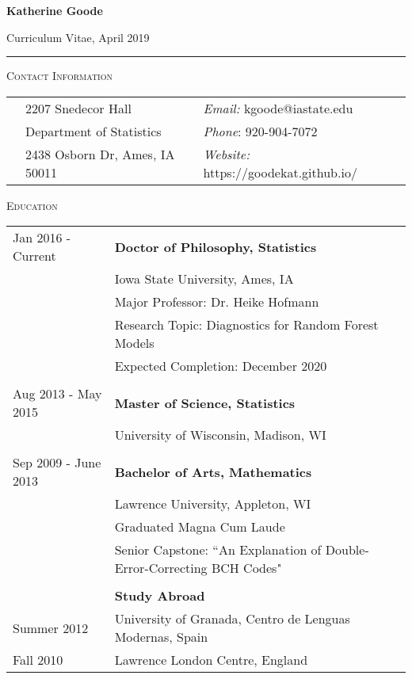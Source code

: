 \documentclass[10pt, oneside]{article}
\begin{document}
\begin{LARGE} \noindent\textbf{Katherine Goode} \end{LARGE} \hfill Curriculum Vitae, April 2019\\
\rule{\textwidth}{1pt}

\vspace{0.25cm}

\noindent \textsc{Contact Information} \hrulefill
\begin{longtable}{p{3.9cm}p{6.5cm}p{6.5cm}}
& 2207 Snedecor Hall & \emph{Email:} kgoode@iastate.edu\\
& Department of Statistics & \emph{Phone}: 920-904-7072\\
& 2438 Osborn Dr, Ames, IA 50011 & \emph{Website:} https://goodekat.github.io/
\end{longtable}

\noindent \textsc{Education} \hrulefill
\begin{longtable}{p{3.5cm}p{13cm}}
\hfill{Jan 2016 - Current} & \textbf{Doctor of Philosophy, Statistics}\\
& Iowa State University, Ames, IA\\
& Major Professor: Dr. Heike Hofmann\\
& Research Topic: Diagnostics for Random Forest Models\\
& Expected Completion: December 2020\\
\\
\hfill{Aug 2013 - May 2015} & \textbf{Master of Science, Statistics}\\
& University of Wisconsin, Madison, WI\\
\\
\hfill{Sep 2009 - June 2013} & \textbf{Bachelor of Arts, Mathematics}\\
& Lawrence University, Appleton, WI\\
& Graduated Magna Cum Laude\\
& Senior Capstone: ``An Explanation of Double-Error-Correcting BCH Codes"\\
\\
& \textbf{Study Abroad}\\
\hfill{Summer 2012} & \indent University of Granada, Centro de Lenguas Modernas, Spain\\
\hfill{Fall 2010} & \indent Lawrence London Centre, England
\end{longtable}
\end{document}
